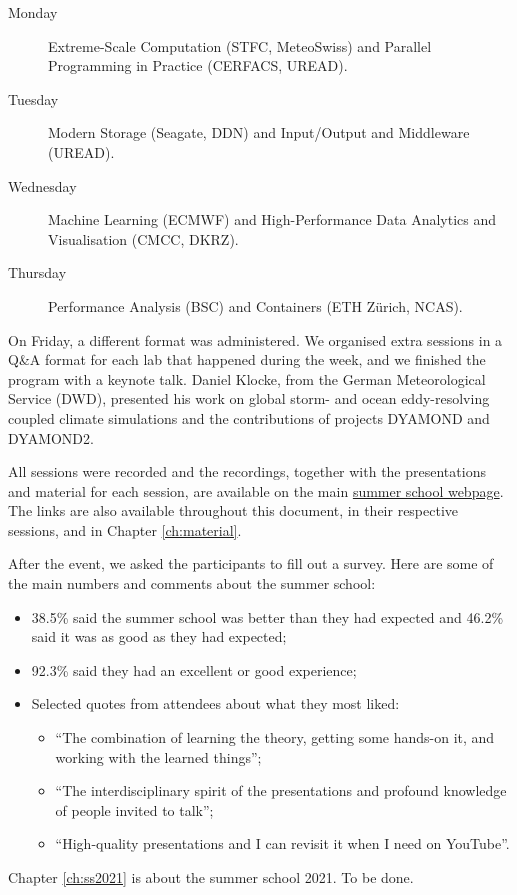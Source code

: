 \begin{description}

\item[Monday] Extreme-Scale Computation (STFC, MeteoSwiss) and Parallel Programming in Practice (CERFACS, UREAD).

\item[Tuesday] Modern Storage (Seagate, DDN) and Input/Output and Middleware (UREAD).

\item[Wednesday] Machine Learning (ECMWF) and High-Performance Data Analytics and Visualisation (CMCC, DKRZ).

\item[Thursday] Performance Analysis (BSC) and Containers (ETH Zürich, NCAS).

\end{description}

On Friday, a different format was administered. We organised extra sessions in a Q\&A format for each lab that happened during the week, and we finished the program with a keynote talk. Daniel Klocke, from the German Meteorological Service (DWD), presented his work on global storm- and ocean eddy-resolving coupled climate simulations and the contributions of projects DYAMOND and DYAMOND2.

All sessions were recorded and the recordings, together with the presentations and material for each session, are available on the main \href{https://hps.vi4io.org/events/2020/esiwace-school}{summer school webpage}. The links are also available throughout this document, in their respective sessions, and in Chapter \ref{ch:material}.

After the event, we asked the participants to fill out a survey. Here are some of the main numbers and comments about the summer school:

\begin{itemize}

\item 38.5\% said the summer school was better than they had expected and 46.2\% said it was as good as they had expected;

\item 92.3\% said they had an excellent or good experience;

\item Selected quotes from attendees about what they most liked:

\begin{itemize}

\item ``The combination of learning the theory, getting some hands-on it, and working with the learned things'';
\item ``The interdisciplinary spirit of the presentations and profound knowledge of people invited to talk'';
\item ``High-quality presentations and I can revisit it when I need on YouTube''.

\end{itemize}

\end{itemize}

Chapter \ref{ch:ss2021} is about the summer school 2021. To be done.